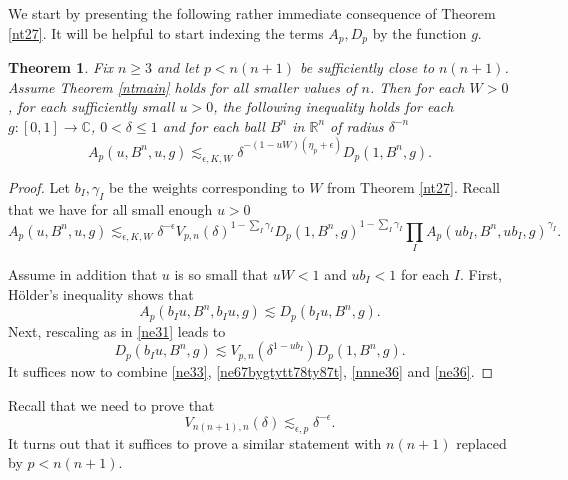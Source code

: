 \documentclass[amssymb,amsfonts,12pt]{amsart}
\newtheorem{theorem}{Theorem}[section]
\def\R{{\mathbb R}}
\def\C{{\mathbb C}}
\begin{document}
We start by presenting the following rather immediate consequence of Theorem \ref{nt27}. It will be helpful to start indexing the terms $A_p,D_p$ by the function $g$.
\begin{theorem}
\label{nt27agga}Fix $n\ge 3$ and let $p<n(n+1)$ be sufficiently close to $n(n+1)$. Assume Theorem \ref{ntmain} holds for all smaller values of $n$. Then for each $W>0$, for each sufficiently small $u>0$, the following inequality holds for each $g:[0,1]\to\C$,  $0<\delta\le 1$ and for each ball $B^n$ in $\R^n$ of radius $\delta^{-n}$
$$
A_p(u,B^n,u,g)\lesssim_{\epsilon,K, W}\delta^{-(1-uW)(\eta_p+\epsilon)}D_p(1,B^n,g).
$$
\end{theorem}
\begin{proof}Let $b_I,\gamma_I$ be the weights corresponding to $W$ from Theorem \ref{nt27}. Recall that we have for all small enough $u>0$
\begin{equation}
\label{ne67bygtytt78ty87t}
A_p(u,B^n,u,g)\lesssim_{\epsilon,K,W}\delta^{-\epsilon}V_{p,n}(\delta)^{1-\sum_I\gamma_I}D_p(1,B^n,g)^{1-\sum_I\gamma_I}\prod_{I}A_p(ub_I,B^n,ub_I,g)^{\gamma_I}.
\end{equation}

Assume in addition that $u$ is so small that $uW<1$ and $ub_I<1$ for each $I$.
First, H\"older's inequality shows that
\begin{equation}\label{nnne36}A_p(b_Iu,B^n,b_Iu,g)\lesssim D_p(b_Iu,B^n,g).
\end{equation}
Next, rescaling as in \eqref{ne31} leads to
\begin{equation}\label{ne36}
D_p(b_Iu,B^n,g)\lesssim V_{p,n}(\delta^{1-ub_I} )D_p(1,B^n,g).
\end{equation}
It suffices now to combine \eqref{ne33}, \eqref{ne67bygtytt78ty87t}, \eqref{nnne36} and \eqref{ne36}.

\end{proof}




Recall that we need to prove that
\begin{equation}
\label{ne70}
V_{n(n+1),n}(\delta)\lesssim_{\epsilon,p} \delta^{-\epsilon}.
\end{equation}
It turns out that it suffices to prove a similar statement with $n(n+1)$ replaced by $p<n(n+1)$.
\end{document}
